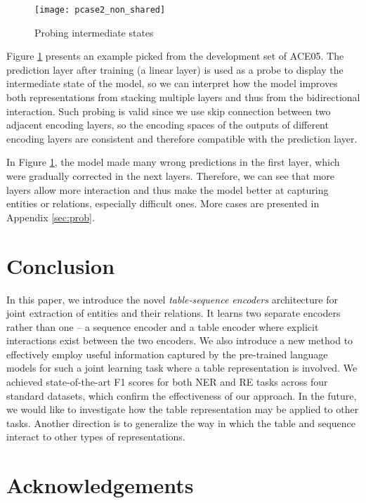 \documentclass[11pt,a4paper]{article}
\begin{document}
\begin{figure}[t!]
    \centering
    \texttt{[image: pcase2\_non\_shared]}
    \caption{Probing intermediate states}
    \label{fig:main_pcase1}
\end{figure}

Figure \ref{fig:main_pcase1} presents an example picked from the development set of ACE05.
The prediction layer after training (a linear layer) is used as a probe to display the intermediate state of the model,
so we can interpret how the model improves both representations from stacking multiple layers and thus from the bidirectional interaction.
{Such probing is valid since we use skip connection between two adjacent encoding layers, so the encoding spaces of the outputs of different encoding layers are consistent and therefore compatible with the prediction layer.}

In Figure \ref{fig:main_pcase1}, the model made many wrong predictions in the first layer, which were gradually corrected in the next layers.
Therefore, we can see that more layers allow more interaction and thus make the model better at capturing entities or relations, especially difficult ones.
More cases are presented in Appendix \ref{sec:prob}.
 
\section{Conclusion}

In this paper, we introduce the novel {\em table-sequence encoders} architecture for joint extraction of entities and their relations.
It learns two separate encoders rather than one -- a sequence encoder and a table encoder where explicit interactions exist between the two encoders.
We also introduce a new method to effectively employ useful information captured by the pre-trained language models for such a joint learning task where a table representation is involved.
We achieved state-of-the-art F1 scores for both NER and RE tasks across four standard datasets, which confirm the effectiveness of our approach.
{\color{black}
In the future, we would like to investigate how the table representation may be applied to other tasks.
Another direction is to generalize the way in which the table and sequence interact to other types of representations.
}

\section*{Acknowledgements}
\end{document}
